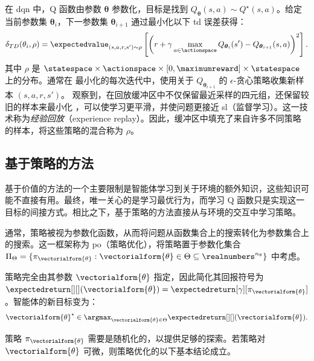 在 \gls{dqn} 中，Q 函数由参数 $\boldsymbol\theta$ 参数化，目标是找到 $Q_{\boldsymbol\theta}(s,a) \sim Q^\star(s,a)$。给定当前参数集 $\boldsymbol\theta_i$，下一参数集 $\boldsymbol\theta_{i+1}$ 通过最小化以下 \gls{td} 误差获得：
\begin{align}
\label{eq:update_dqn}
    \delta_{TD}(\theta_i,\rho) = \expectedvalue_{(s,a,r,s')\sim\rho}\left[\left(r+\gamma\max_{a\in\actionspace}Q_{\boldsymbol\theta_{i}}(s') - Q_{\boldsymbol\theta_{i+1}}(s,a)\right)^2\right].
\end{align}
其中 $\rho$ 是 $\statespace\times\actionspace\times[0,\maximumreward]\times\statespace$ 上的分布。通常在  最小化的每次迭代中，使用关于 $Q_{\boldsymbol\theta_{i+1}}$ 的 $\epsilon$-贪心策略收集新样本 $(s,a,r,s')$。\cite{mnih2013playing} 观察到，在回放缓冲区中不仅保留最近采样的四元组，还保留较旧的样本来最小化 ，可以使学习更平滑，并使问题更接近 \gls{sl}（监督学习）。这一技术称为\emph{经验回放}（experience replay）。因此，缓冲区中填充了来自许多不同策略的样本，将这些策略的混合称为 $\rho$。

\subsection{基于策略的方法}
\label{subsec:policy_based}
基于价值的方法的一个主要限制是智能体学习到关于环境的额外知识，这些知识可能不直接有用。最终，唯一关心的是学习最优行为，而学习 Q 函数只是实现这一目标的间接方式。相比之下，基于策略的方法直接从与环境的交互中学习策略。

通常，策略被视为参数化函数，从而将问题从函数集合上的搜索转化为参数集合上的搜索。这一框架称为 \gls{po}（策略优化）\cite{deisenroth2013survey}，将策略置于参数化集合 $\Pi_{\Theta} = \{\pi_{\vectorialform{\theta}} : \vectorialform{\theta} \in \Theta \subseteq \realnumbers^{n_\theta}\}$ 中考虑。

策略完全由其参数 $\vectorialform{\theta}$ 指定，因此简化其回报符号为 $\expectedreturn[][](\vectorialform{\theta})=\expectedreturn[\gamma][\pi_\vectorialform{\theta}]$。智能体的新目标变为：
\begin{align}
\label{eq:objective_policy_opt}
	\vectorialform{\theta}^\star \in \argmax_{\vectorialform{\theta} \in \Theta} \expectedreturn[][](\vectorialform{\theta}).
\end{align}

策略 $\pi_{\vectorialform{\theta}}$ 需要是随机化的，以提供足够的探索。若策略对 $\vectorialform{\theta}$ 可微，则策略优化的以下基本结论成立。

